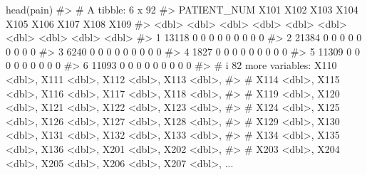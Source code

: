 \documentclass[
  letterpaper,
]{latex/krantz}
\makeatletter
\newenvironment{Shaded}{\begin{snugshade}}{\end{snugshade}}
\newcommand{\CommentTok}[1]{\textcolor[rgb]{0.37,0.37,0.37}{#1}}
\newcommand{\FunctionTok}[1]{\textcolor[rgb]{0.28,0.35,0.67}{#1}}
\newcommand{\NormalTok}[1]{\textcolor[rgb]{0.00,0.23,0.31}{#1}}
\newenvironment{kframe}{%
\medskip{}
\setlength{\fboxsep}{.8em}
 \def\at@end@of@kframe{}%
 \ifinner\ifhmode%
  \def\at@end@of@kframe{\end{minipage}}%
  \begin{minipage}{\columnwidth}%
 \fi\fi%
 \def\FrameCommand##1{\hskip\@totalleftmargin \hskip-\fboxsep
 \colorbox{shadecolor}{##1}\hskip-\fboxsep
     \hskip-\linewidth \hskip-\@totalleftmargin \hskip\columnwidth}%
 \MakeFramed {\advance\hsize-\width
   \@totalleftmargin\z@ \linewidth\hsize
   \@setminipage}}%
 {\par\unskip\endMakeFramed%
 \at@end@of@kframe}
\renewenvironment{Shaded}{\begin{kframe}}{\end{kframe}}
\makeatother
\begin{document}
\begin{Shaded}
\begin{Highlighting}[]
\FunctionTok{head}\NormalTok{(pain)}
\CommentTok{\#\textgreater{} \# A tibble: 6 x 92}
\CommentTok{\#\textgreater{}   PATIENT\_NUM  X101  X102  X103  X104  X105  X106  X107  X108  X109}
\CommentTok{\#\textgreater{}         \textless{}dbl\textgreater{} \textless{}dbl\textgreater{} \textless{}dbl\textgreater{} \textless{}dbl\textgreater{} \textless{}dbl\textgreater{} \textless{}dbl\textgreater{} \textless{}dbl\textgreater{} \textless{}dbl\textgreater{} \textless{}dbl\textgreater{} \textless{}dbl\textgreater{}}
\CommentTok{\#\textgreater{} 1       13118     0     0     0     0     0     0     0     0     0}
\CommentTok{\#\textgreater{} 2       21384     0     0     0     0     0     0     0     0     0}
\CommentTok{\#\textgreater{} 3        6240     0     0     0     0     0     0     0     0     0}
\CommentTok{\#\textgreater{} 4        1827     0     0     0     0     0     0     0     0     0}
\CommentTok{\#\textgreater{} 5       11309     0     0     0     0     0     0     0     0     0}
\CommentTok{\#\textgreater{} 6       11093     0     0     0     0     0     0     0     0     0}
\CommentTok{\#\textgreater{} \# i 82 more variables: X110 \textless{}dbl\textgreater{}, X111 \textless{}dbl\textgreater{}, X112 \textless{}dbl\textgreater{}, X113 \textless{}dbl\textgreater{},}
\CommentTok{\#\textgreater{} \#   X114 \textless{}dbl\textgreater{}, X115 \textless{}dbl\textgreater{}, X116 \textless{}dbl\textgreater{}, X117 \textless{}dbl\textgreater{}, X118 \textless{}dbl\textgreater{},}
\CommentTok{\#\textgreater{} \#   X119 \textless{}dbl\textgreater{}, X120 \textless{}dbl\textgreater{}, X121 \textless{}dbl\textgreater{}, X122 \textless{}dbl\textgreater{}, X123 \textless{}dbl\textgreater{},}
\CommentTok{\#\textgreater{} \#   X124 \textless{}dbl\textgreater{}, X125 \textless{}dbl\textgreater{}, X126 \textless{}dbl\textgreater{}, X127 \textless{}dbl\textgreater{}, X128 \textless{}dbl\textgreater{},}
\CommentTok{\#\textgreater{} \#   X129 \textless{}dbl\textgreater{}, X130 \textless{}dbl\textgreater{}, X131 \textless{}dbl\textgreater{}, X132 \textless{}dbl\textgreater{}, X133 \textless{}dbl\textgreater{},}
\CommentTok{\#\textgreater{} \#   X134 \textless{}dbl\textgreater{}, X135 \textless{}dbl\textgreater{}, X136 \textless{}dbl\textgreater{}, X201 \textless{}dbl\textgreater{}, X202 \textless{}dbl\textgreater{},}
\CommentTok{\#\textgreater{} \#   X203 \textless{}dbl\textgreater{}, X204 \textless{}dbl\textgreater{}, X205 \textless{}dbl\textgreater{}, X206 \textless{}dbl\textgreater{}, X207 \textless{}dbl\textgreater{}, ...}

\end{Highlighting}
\end{Shaded}
\end{document}
